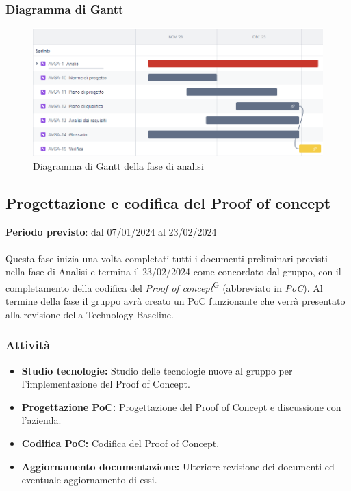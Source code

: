\newpage 
\subsubsection{Diagramma di Gantt}\label{sec:pianificazione:analisi:gantt}

\begin{figure}[H]
    \centering
    \includegraphics[width=1\textwidth]{images/gantt_analisi.PNG}
    \caption{Diagramma di Gantt della fase di analisi}
    \label{fig:gantt_analisi}
\end{figure}


\subsection{Progettazione e codifica del Proof of concept}\label{sec:pianificazione:progRTB}

\textbf{Periodo previsto}: dal 07/01/2024 al 23/02/2024\\\\
Questa fase inizia una volta completati tutti i documenti preliminari previsti nella fase di Analisi e termina il 23/02/2024 come concordato dal gruppo, con il completamento della codifica del \textit{Proof of concept}\textsuperscript{G} (abbreviato in \textit{PoC}). Al termine della fase il gruppo avrà creato un PoC funzionante che verrà presentato alla revisione della Technology Baseline.

\subsubsection{Attività}\label{sec:pianificazione:progRTB:attivita}
\begin{itemize}
    \item \textbf{Studio tecnologie:} Studio delle tecnologie nuove al gruppo per l'implementazione del Proof of Concept.
    \item \textbf{Progettazione PoC:} Progettazione del Proof of Concept e discussione con l'azienda.
    \item \textbf{Codifica PoC:} Codifica del Proof of Concept.
    \item \textbf{Aggiornamento documentazione:} Ulteriore revisione dei documenti ed eventuale aggiornamento di essi.
\end{itemize}

